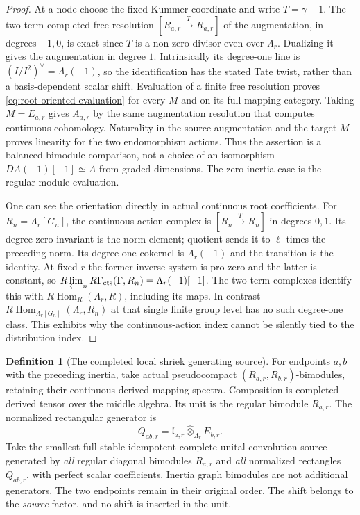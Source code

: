 \documentclass[11pt]{article}
\theoremstyle{definition}
\newtheorem{definition}[proposition]{Definition}
\theoremstyle{remark}
\newcommand{\RHom}{R\operatorname{Hom}}
\begin{document}
\begin{proof}
At a node choose the fixed Kummer coordinate and write
$T=\gamma-1$.  The two-term completed free resolution
$[R_{a,r}\xrightarrow{T}R_{a,r}]$ of the augmentation, in degrees
$-1,0$, is exact since $T$ is a non-zero-divisor even over
$\Lambda_r$.  Dualizing it gives the augmentation in degree $1$.
Intrinsically its degree-one line is
$(I/I^2)^\vee=\Lambda_r(-1)$, so the identification has the stated
Tate twist, rather than a basis-dependent scalar shift.
Evaluation of a finite free resolution proves
\eqref{eq:root-oriented-evaluation} for every $M$ and on its full
mapping category.  Taking $M=E_{a,r}$ gives $A_{a,r}$ by the same
augmentation resolution that computes continuous cohomology.
Naturality in the source augmentation and the target $M$ proves
linearity for the two endomorphism actions.  Thus the assertion is
a balanced bimodule comparison, not a choice of an isomorphism
$D A(-1)[-1]\simeq A$ from graded dimensions.  The zero-inertia case
is the regular-module evaluation.

One can see the orientation directly in actual continuous root
coefficients.  For $R_n=\Lambda_r[G_n]$, the continuous action
complex is $[R_n\xrightarrow{T}R_n]$ in degrees $0,1$.
Its degree-zero invariant is the norm element; quotient sends it
to $\ell$ times the preceding norm.  Its degree-one cokernel is
$\Lambda_r(-1)$ and the transition is the identity.  At fixed $r$
the former inverse system is pro-zero and the latter is constant,
so $R\varprojlim_nR\Gamma_{\mathrm{cts}}(\Gamma,R_n)
=\Lambda_r(-1)[-1]$.  The two-term complexes identify this with
$\RHom_R(\Lambda_r,R)$, including its maps.  In contrast
$R\operatorname{Hom}_{\Lambda_r[G_n]}(\Lambda_r,R_n)$ at that
single finite group level has no such degree-one class.  This
exhibits why the continuous-action index cannot be silently tied
to the distribution index.
\end{proof}

\begin{definition}[The completed local shriek generating source]
\label{def:completed-root-shriek-source}
For endpoints $a,b$ with the preceding inertia, take actual
pseudocompact $(R_{a,r},R_{b,r})$-bimodules, retaining their continuous
derived mapping spectra.  Composition is completed derived tensor
over the middle algebra.  Its unit is the regular bimodule $R_{a,r}$.
The normalized rectangular generator is
\[
 Q_{ab,r}=\mathfrak l_{a,r}\widehat\otimes_{\Lambda_r}E_{b,r}.
\]
Take the smallest full stable idempotent-complete unital convolution
source generated by \emph{all} regular diagonal bimodules $R_{a,r}$
and \emph{all} normalized rectangles $Q_{ab,r}$, with perfect scalar
coefficients.  Inertia graph bimodules are not additional generators.  The two
endpoints remain in their original order.  The shift belongs to
the \emph{source} factor, and no shift is inserted in the unit.
\end{definition}
\end{document}
